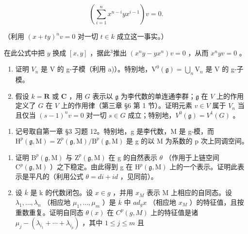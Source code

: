 \[
\left(\sum_ {i = 1} ^ {n} x ^ {n - i} y x ^ {i - 1}\right) v = 0.
\]

（利用 \((x + ty)^n v = 0\) 对一切 \(t\in k\) 成立这一事实。）

在此公式中把 \(y\) 换成 \([x, y]\) ，据此\(^3\)推出 \((x^n y - y x^n)v = 0\) ，从而 \(x^n y v = 0\) 。

\begin{enumerate}
\def\labelenumi{\alph{enumi})}
\setcounter{enumi}{1}
\item
  证明 \(V_{n}\) 是 V 的 g-子模（利用 a)）。特别地，\(\mathrm{V}^{0}(\mathfrak{g})=\bigcup_{n}\mathrm{V}_{n}\) 是 V 的 g-子模。
\item
  假设 \(k = \mathbf{R}\) 或 \(\mathbf{C}\) ，用 \(G\) 表示以 \(\mathfrak{g}\) 为李代数的单连通李群；\(\mathfrak{g}\) 在 \(V\) 上的作用定义了 \(G\) 在 \(V\) 上的作用律（第三章 §6 第 1 节）。证明元素 \(v \in V\) 属于 \(V_n\) 当且仅当 \((s - 1)^n v = 0\) 对一切 \(s \in G\) 成立；特别地，\(V^0(\mathfrak{g}) = V^1(G)\) 。
\end{enumerate}

\begin{enumerate}
\def\labelenumi{\arabic{enumi})}
\setcounter{enumi}{5}
\tightlist
\item
  记号取自第一章 §3 习题 12。特别地，g 是李代数，M 是 g-模，而 \(\mathrm{H}^{p}(\mathfrak{g},\mathrm{M})=\mathrm{Z}^{p}(\mathfrak{g},\mathrm{M})/\mathrm{B}^{p}(\mathfrak{g},\mathrm{M})\) 是 g 的以 M 为系数的 p 次上同调空间。
\end{enumerate}

\begin{enumerate}
\def\labelenumi{\alph{enumi})}
\item
  证明 \(\mathrm{B}^{p}(\mathfrak{g},\mathrm{M})\) 与 \(\mathrm{Z}^{p}(\mathfrak{g},\mathrm{M})\) 在 g 的自然表示 \(\theta\) （作用于上链空间 \(\mathrm{C}^{p}(\mathfrak{g},\mathrm{M})\) ）之下稳定。由此得到 g 在 \(\mathrm{H}^{p}(\mathfrak{g},\mathrm{M})\) 上的一个表示。证明此表示是平凡的（利用公式 \(\theta = di + id\) ，见同前）。
\item
  设 \(\overline{k}\) 是 k 的代数闭包。设 \(x \in g\) ，并用 \(x_{M}\) 表示 M 上相应的自同态。设 \(\lambda_{1}, \ldots, \lambda_{n}\) （相应地 \(\mu_{1}, \ldots, \mu_{m}\) ）是 \(\overline{k}\) 中 \(ad_{g}x\) （相应地 \(x_{M}\) ）的特征值，且按重数重复。证明自同态 \(\theta(x)\) 在 \(C^{p}(g, M)\) 上的特征值是诸 \(\mu_{j} - (\lambda_{i_{1}} + \cdots + \lambda_{i_{p}})\) ，其中 \(1 \leq j \leq m\) 且
\end{enumerate}

